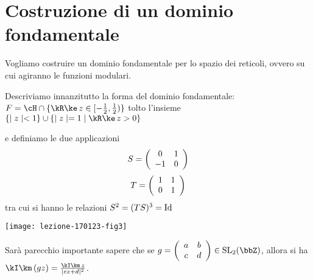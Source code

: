 \section{Costruzione di un dominio fondamentale}

Vogliamo costruire un dominio fondamentale per lo spazio dei reticoli,
ovvero su cui agiranno le funzioni modulari.

Descriviamo innanzitutto la forma del dominio fondamentale:
$ F = \cH \cap \{ \Re z \in [ -\frac{1}{2}, \frac{1}{2} ) \} $
tolto l'insieme $\{ \abs{z} < 1 \} \cup \{ \abs{z} = 1 \mid \Re z > 0 \}$

e definiamo le due applicazioni
$$ S = \left({\begin{array}{cc} 0 & 1 \\ -1 & 0 \\ \end{array}}\right) $$
$$ T = \left({\begin{array}{cc} 1 & 1 \\ 0 & 1 \\ \end{array}}\right) $$
tra cui si hanno le relazioni $S^2 = (TS)^3 = \text{Id}$

\begin{center}
  \texttt{[image: lezione-170123-fig3]}
\end{center}

\begin{osservazione}
  Sarà parecchio importante sapere che se
  $g = \lbr{\begin{array}{cc} a & b \\ c & d \\ \end{array}} \in
  \SL_2(\bbZ)$, allora si ha $\Im (gz) = \frac{\Im z}{\abs{cz + d}^2}$.
\end{osservazione}


